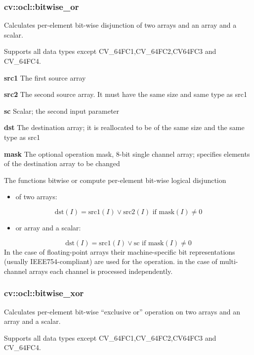 \documentclass{article}
\begin{document}
\newpage

\subsubsection{cv::ocl::bitwise{\_}or }
\label{subsubsec:mylabel8}
Calculates per-element bit-wise disjunction of two arrays and an array and a
scalar.

Supports all data types except CV{\_}64FC1,CV{\_}64FC2,CV64FC3 and
CV{\_}64FC4.

\textbf{src1 }The first source array

\textbf{src2 }The second source array. It must have the same size and same
type as src1

\textbf{sc }Scalar; the second input parameter

\textbf{dst }The destination array; it is reallocated to be of the same size
and the same type as src1

\textbf{mask }The optional operation mask, 8-bit single channel array;
specifies elements of the destination array to be changed

The functions bitwise or compute per-element bit-wise logical disjunction

\begin{itemize}
\item of two arrays:
\end{itemize}
\[
\mbox{dst}\left( I \right)=\mbox{src1}\left( I \right)\vee \mbox{src2}\left(
I \right)\mbox{ if mask}\left( I \right)\ne 0
\]
\begin{itemize}
\item or array and a scalar:
\end{itemize}
\[
\mbox{dst}\left( I \right)=\mbox{src1}\left( I \right)\vee \mbox{sc if
mask}\left( I \right)\ne 0
\]
In the case of floating-point arrays their machine-specific bit
representations (usually IEEE754-compliant) are used for the operation. in
the case of multi-channel arrays each channel is processed independently.

\newpage

\subsubsection{cv::ocl::bitwise{\_}xor }
\label{subsubsec:mylabel9}
Calculates per-element bit-wise ``exclusive or'' operation on two arrays and
an array and a scalar.

Supports all data types except CV{\_}64FC1,CV{\_}64FC2,CV64FC3 and
CV{\_}64FC4.
\end{document}
